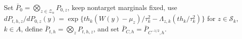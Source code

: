 Set \(\bar P_0=\bigotimes_{z\in\mathcal Z_n}P_{0,z}\), keep nontarget marginals fixed, use \(dP_{t,h,z}/dP_{0,z}(y)=\exp\{t h_k(W(y)-\mu_z)/\tau_k^2-\Lambda_{z,k}(t h_k/\tau_k^2)\}\) for \(z\in\mathcal S_k\), \(k\in A\), define \(\bar P_{t,h}=\bigotimes_zP_{t,h,z}\), and set \(\bar P_{C,h}=\bar P_{C^{-1/2},h}\).